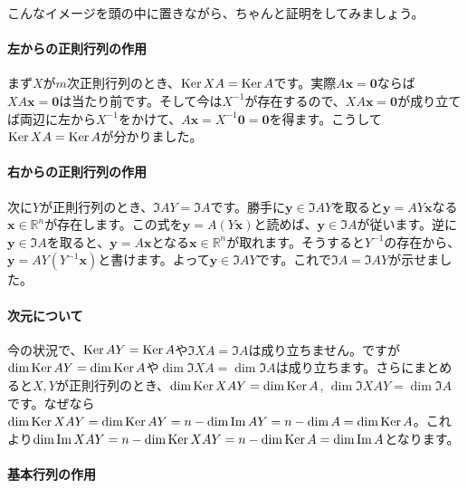 こんなイメージを頭の中に置きながら、ちゃんと証明をしてみましょう。

\paragraph{左からの正則行列の作用}

まず$X$が$m$次正則行列のとき、$\operatorname{Ker} XA = \operatorname{Ker} A$です。実際$A\bm{x} = \bm{0}$ならば$XA\bm{x} = \bm{0}$は当たり前です。そして今は$X^{-1}$が存在するので、$XA\bm{x} = \bm{0}$が成り立てば両辺に左から$X^{-1}$をかけて、$A\bm{x} = X^{-1}\bm{0} = \bm{0}$を得ます。こうして$\operatorname{Ker} XA = \operatorname{Ker} A$が分かりました。


\paragraph{右からの正則行列の作用}

次に$Y$が正則行列のとき、$\Im AY = \Im A$です。勝手に$\bm{y} \in \Im AY$を取ると$\bm{y} = AY\bm{x}$なる$\bm{x} \in \mathbb{R}^n$が存在します。この式を$\bm{y} = A(Y\bm{x})$と読めば、$\bm{y} \in \Im A$が従います。逆に$\bm{y} \in \Im A$を取ると、$\bm{y} = A\bm{x}$となる$\bm{x} \in  \mathbb{R}^n$が取れます。そうすると$Y^{-1}$の存在から、$\bm{y} = AY(Y^{-1}\bm{x})$と書けます。よって$\bm{y} \in \Im AY$です。これで$\Im A = \Im AY$が示せました。


\paragraph{次元について} 今の状況で、$\operatorname{Ker} AY = \operatorname{Ker} A$や$\Im XA = \Im A$は成り立ちません。ですが$\dim \operatorname{Ker} AY = \dim \operatorname{Ker} A$や$\dim \Im XA = \dim \Im A$は成り立ちます。さらにまとめると$X, Y$が正則行列のとき、$\dim \operatorname{Ker} XAY = \dim \operatorname{Ker} A$, $\dim \Im XAY = \dim \Im A$です。なぜなら$\dim \operatorname{Ker} XAY = \dim \operatorname{Ker} AY = n - \dim \mathrm{Im}\, AY = n - \dim A = \dim \operatorname{Ker} A$。これより$\dim \mathrm{Im}\, XAY = n - \dim \operatorname{Ker} XAY = n - \dim \operatorname{Ker} A = \dim \mathrm{Im}\, A$となります。

\paragraph{基本行列の作用}

